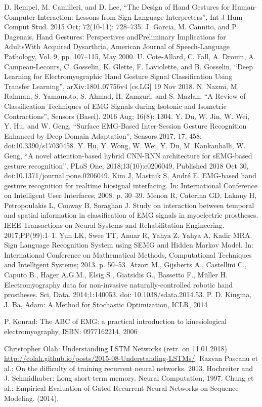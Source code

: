 \documentclass[conference]{IEEEtran}
\begin{document}
\begin{thebibliography}{00}
 D. Rempel, M. Camilleri, and D. Lee, ``The Design of Hand Gestures for Human-Computer Interaction: Lessons from Sign Language Interpreters'', Int J Hum Comput Stud. 2015 Oct; 72(10-11): 728–735.
 J. Garcia, M. Cannito, and P. Dagenais, Hand Gestures: Perspectives andPreliminary Implications for AdultsWith Acquired Dysarthria, American Journal of Speech-Language Pathology, Vol. 9,  pp. 107–115, May 2000.
 U. Cote-Allard, C. Fall, A. Drouin, A. Campeau-Lecours, C. Gosselin, K. Glette, F. Laviolette, and B. Gosselin, ``Deep Learning for Electromyographic Hand Gesture Signal Classification Using Transfer Learning'', arXiv:1801.07756v4 [cs.LG] 19 Nov 2018.
 N. Nazmi, M. Rahman, S. Yamamoto, S. Ahmad, H. Zamzuri, and S. Mazlan, ``A Review of Classification Techniques of EMG Signals during Isotonic and Isometric Contractions'', Sensors (Basel). 2016 Aug; 16(8): 1304.
 Y. Du, W. Jin, W. Wei, Y. Hu, and W. Geng, ``Surface EMG-Based Inter-Session Gesture Recognition Enhanced by Deep Domain Adaptation'', Sensors 2017, 17, 458; doi:10.3390/s17030458.
 Y. Hu, Y. Wong, W. Wei, Y. Du, M. Kankanhalli, W. Geng, ``A novel attention-based hybrid CNN-RNN architecture for sEMG-based gesture recognition'', PLoS One, 2018;13(10):e0206049, Published 2018 Oct 30, doi:10.1371/journal.pone.0206049.
 Kim J, Mastnik S, André E. EMG-based hand gesture recognition for realtime biosignal interfacing. In: International Conference on Intelligent User Interfaces; 2008. p. 30–39.
 Menon R, Caterina GD, Lakany H, Petropoulakis L, Conway B, Soraghan J. Study on interaction between temporal and spatial information in classification of EMG signals in myoelectric prostheses. IEEE Transactions on Neural Systems and Rehabilitation Engineering. 2017;PP(99):1–1.
 Yun LK, Swee TT, Anuar R, Yahya Z, Yahya A, Kadir MRA. Sign Language Recognition System using SEMG and Hidden Markov Model. In: International Conference on Mathematical Methods, Computational Techniques and Intelligent Systems; 2013. p. 50–53.
 Atzori M., Gijsberts A., Castellini C., Caputo B., Hager A.G.M., Elsig S., Giatsidis G., Bassetto F., Müller H. Electromyography data for non-invasive naturally-controlled robotic hand prostheses. Sci. Data. 2014;1:140053. doi: 10.1038/sdata.2014.53.
 P. D. Kingma, J. Ba, Adam: A Method for Stochastic Optimization, ICLR, 2014

 P. Konrad: The ABC of EMG: a practical introduction to kinesiological electromyography, ISBN: 0977162214, 2006


Christopher Olah: Understanding LSTM Networks (retr. on 11.01.2018) \url{http://colah.github.io/posts/2015-08-Understanding-LSTMs/}.
Razvan Pascanu et al.: On the difficulty of training recurrent neural networks. 2013.
Hochreiter and J. Schmidhuber: Long short-term memory. Neural Computation, 1997.
Chung et al.: Empirical Evaluation of Gated Recurrent Neural Networks on Sequence Modeling. (2014).

\end{thebibliography}
\end{document}
